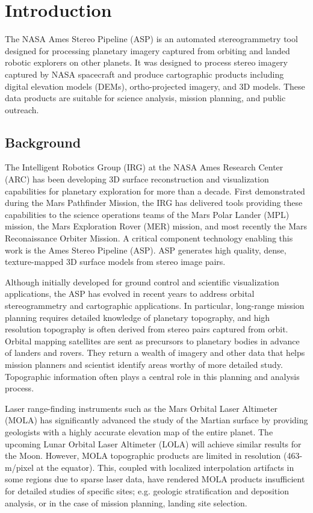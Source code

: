 \chapter{Introduction}

The NASA Ames Stereo Pipeline (ASP) is an automated stereogrammetry
tool designed for processing planetary imagery captured from orbiting
and landed robotic explorers on other planets.  It was designed to
process stereo imagery captured by NASA spacecraft and produce
cartographic products including digital elevation models (DEMs),
ortho-projected imagery, and 3D models.  These data products are
suitable for science analysis, mission planning, and public outreach.

\section{Background}

The Intelligent Robotics Group (IRG) at the NASA Ames Research Center
(ARC) has been developing 3D surface reconstruction and visualization
capabilities for planetary exploration for more than a decade.  First
demonstrated during the Mars Pathfinder Mission, the IRG has delivered
tools providing these capabilities to the science operations teams of
the Mars Polar Lander (MPL) mission, the Mars Exploration Rover (MER)
mission, and most recently the Mars Reconaissance Orbiter Mission. A
critical component technology enabling this work is the Ames Stereo
Pipeline (ASP).  ASP generates high quality, dense, texture-mapped
3D surface models from stereo image pairs.

Although initially developed for ground control and scientific
visualization applications, the ASP has evolved in recent years to
address orbital stereogrammetry and cartographic applications.  In
particular, long-range mission planning requires detailed knowledge of
planetary topography, and high resolution topography is often derived
from stereo pairs captured from orbit.  Orbital mapping satellites are
sent as precursors to planetary bodies in advance of landers and
rovers.  They return a wealth of imagery and other data that helps
mission planners and scientist identify areas worthy of more detailed
study. Topographic information often plays a central role in this
planning and analysis process.

Laser range-finding instruments such as the Mars Orbital Laser
Altimeter (MOLA) \citep{1992JGR....97.7781Z,2001JGR...10623689S}
has signiﬁcantly advanced the study of the Martian surface by
providing geologists with a highly accurate elevation map of the
entire planet.  The upcoming Lunar Orbital Laser Altimeter (LOLA)
\citep{2008AGUFM.P31B1419N,2007SSRv..129..391C} will achieve similar
results for the Moon.  However, MOLA topographic products are limited
in resolution (463-m/pixel at the equator).  This, coupled with
localized interpolation artifacts in some regions due to sparse
laser data, have rendered MOLA products insufficient for detailed
studies of speciﬁc sites; e.g. geologic stratification and deposition
analysis, or in the case of mission planning, landing site selection.

